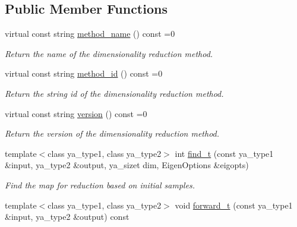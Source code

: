 \subsection*{Public Member Functions}
\begin{CompactItemize}
\item 
\hypertarget{class_y_a_dim_reduce_a2}{
virtual const string \hyperlink{class_y_a_dim_reduce_a2}{method\_\-name} () const =0}
\label{class_y_a_dim_reduce_a2}

\begin{CompactList}\small\item\em Return the name of the dimensionality reduction method. \item\end{CompactList}\item 
\hypertarget{class_y_a_dim_reduce_a3}{
virtual const string \hyperlink{class_y_a_dim_reduce_a3}{method\_\-id} () const =0}
\label{class_y_a_dim_reduce_a3}

\begin{CompactList}\small\item\em Return the string id of the dimensionality reduction method. \item\end{CompactList}\item 
\hypertarget{class_y_a_dim_reduce_a4}{
virtual const string \hyperlink{class_y_a_dim_reduce_a4}{version} () const =0}
\label{class_y_a_dim_reduce_a4}

\begin{CompactList}\small\item\em Return the version of the dimensionality reduction method. \item\end{CompactList}\item 
template$<$class ya\_\-type1, class ya\_\-type2$>$ int \hyperlink{class_y_a_dim_reduce_a5}{find\_\-t} (const ya\_\-type1 \&input, ya\_\-type2 \&output, ya\_\-sizet dim, Eigen\-Options \&eigopts)
\begin{CompactList}\small\item\em Find the map for reduction based on initial samples. \item\end{CompactList}\item 
\hypertarget{class_y_a_dim_reduce_a6}{
template$<$class ya\_\-type1, class ya\_\-type2$>$ void \hyperlink{class_y_a_dim_reduce_a6}{forward\_\-t} (const ya\_\-type1 \&input, ya\_\-type2 \&output) const }
\label{class_y_a_dim_reduce_a6}


\end{CompactItemize}
